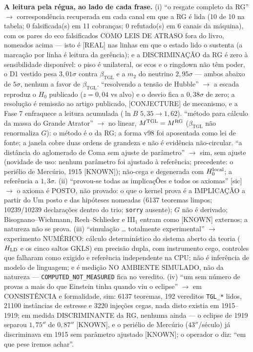 \documentclass[11pt]{article}
\newcommand{\bTGL}{\beta_{\mathrm{TGL}}}\newcommand{\Msun}{M_{\odot}}\newcommand{\TGL}{\mathrm{TGL}}
\theoremstyle{definition}\newtheorem{deriv}{Derivação}
\begin{document}
\textbf{A leitura pela régua, ao lado de cada frase.} (i) ``o resgate completo da RG'' $\to$ correspondência recuperada em cada canal em que a RG é lida (10 de 10 na tabela; 0 falsificada(s) em 11 cobranças; 0 refutado(s) em 6 canais da máquina), com os pares do eco falsificados COMO LEIS DE ATRASO fora do livro, nomeados acima --- isto é \textsf{[REAL]} nas linhas em que o estado lido o sustenta (a marcação por linha é leitura da gerência); e a DISCRIMINAÇÃO da RG é zero à sensibilidade disponível: o piso é unilateral, os ecos e o ringdown não têm poder, o D1 vestido pesa $3{,}01\sigma$ contra $\bTGL$ e a $m_2$ do neutrino $2{,}95\sigma$ --- ambos abaixo de $5\sigma$, nenhum a favor de $\bTGL$. ``resolvendo a tensão de Hubble'' $\to$ a escada reproduz o $H_0$ publicado ($z=0{,}04$ vs alvo) e o desvio fica a $0{,}38\sigma$ de zero; a resolução é remissão ao artigo publicado, \textsf{[CONJECTURE]} de mecanismo, e a Fase 7 enfraquece a leitura acumulada ($\ln B$ $5{,}35\to1{,}62$). ``método para cálculo da massa do Grande Atrator'' $\to$ no linear, $M^{\rm TGL}=M^{\rm RG}$ ($\bTGL$ não renormaliza $G$): o método é o da RG; a forma v98 foi aposentada como lei de fonte; a janela cobre duas ordens de grandeza e não é evidência não-circular. ``a distância do aglomerado de Coma sem ajuste de parâmetro'' $\to$ sim, sem ajuste (novidade de uso: nenhum parâmetro foi ajustado à referência; precedente: o periélio de Mercúrio, 1915 \textsf{[KNOWN]}); não-cega e degenerada com $H_0^{\rm local}$; a referência a $1{,}3\sigma$. (ii) ``provou-se todas as implicaçÕes e todos os axiomas'' [sic] $\to$ o axioma é POSTO, não provado: o que o kernel prova é a IMPLICAÇÃO a partir do Um posto e das hipóteses nomeadas (6137 teoremas limpos; 10239/10239 declarações dentro do trio; \texttt{sorry} ausente); $G$ não é derivado; Bisognano--Wichmann, Reeh--Schlieder e III$_1$ entram como \textsf{[KNOWN]} externos; a natureza não se prova. (iii) ``simulação … totalmente experimental'' $\to$ experimento NUMÉRICO: cálculo determinístico do sistema aberto da teoria ($H_{\rm LD}$ e os cinco saltos GKLS) em precisão dupla, com instrumento cego, controles que falharam como exigido e referência independente na CPU; não é inferência de modelo de linguagem; e é medição NO AMBIENTE SIMULADO, não da natureza --- \texttt{COMPUTED\_NOT\_MEASURED} fica no veredito. (iv) ``um sem número de provas a mais do que Einstein tinha quando viu o eclipse'' $\to$ em CONSISTÊNCIA e formalidade, sim: 6137 teoremas, 192 vereditos \texttt{TGL\_*} lidos, 21100 instâncias de estresse e 3220 injeções cegas, nada disto existia em 1915--1919; em medida DISCRIMINANTE da RG, nenhuma ainda --- o eclipse de 1919 separou $1{,}75''$ de $0{,}87''$ \textsf{[KNOWN]}, e o periélio de Mercúrio ($43''$/século) já discriminava em 1915 sem parâmetro ajustado \textsf{[KNOWN]}; o operador o diz: ``em que pese iremos achar''.
\end{document}
